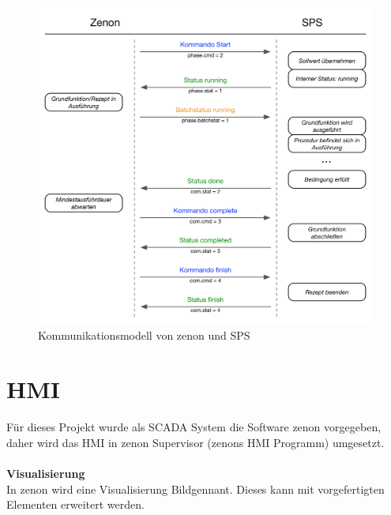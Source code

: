 \begin{figure}[h!]
  \centering
  \includegraphics[height=0.95\textwidth]{graphics/implementation/StateMachine.jpg}
  \caption{Kommunikationsmodell von zenon und SPS}
\end{figure}

\section{HMI}
Für dieses Projekt wurde als SCADA System die Software zenon vorgegeben, daher wird das HMI in zenon Supervisor (zenons HMI Programm) umgesetzt.\\
\\
\textbf{Visualisierung}\\
In zenon wird eine Visualisierung \glqq Bild\grqq\space  gennant. Dieses kann mit vorgefertigten Elementen erweitert werden. 


